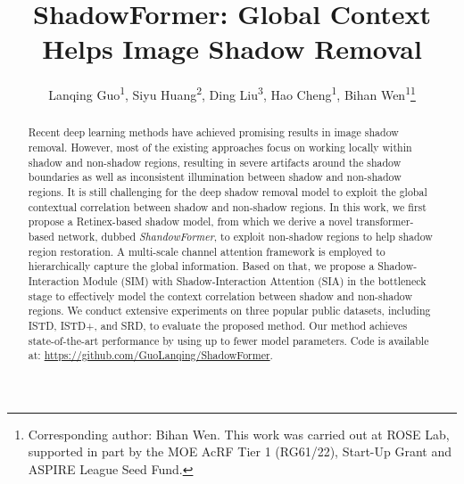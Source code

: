 \documentclass[letterpaper]{article} \usepackage{aaai23}  \usepackage{times}  \usepackage{helvet}  \usepackage{courier}  \usepackage[hyphens]{url}  \usepackage{graphicx} \urlstyle{rm} \def\UrlFont{\rm}  \usepackage{natbib}  \usepackage{caption} \frenchspacing  \setlength{\pdfpagewidth}{8.5in} \setlength{\pdfpageheight}{11in} \usepackage{algorithm}
\title{ShadowFormer: Global Context Helps Image Shadow Removal}
\author{Lanqing Guo\textsuperscript{\rm 1},
	Siyu Huang\textsuperscript{\rm 2},
	  Ding Liu\textsuperscript{\rm 3},
  Hao Cheng\textsuperscript{\rm 1},
  Bihan Wen\textsuperscript{\rm 1}\thanks{Corresponding author: Bihan Wen. This work was carried out at ROSE Lab, supported in part by the MOE AcRF Tier 1 (RG61/22), Start-Up Grant and ASPIRE League Seed Fund.}}
\begin{document}
\maketitle


\begin{abstract}
Recent deep learning methods have achieved promising results in image shadow removal.
However, most of the existing approaches focus on working locally within shadow and non-shadow regions, resulting in severe artifacts around the shadow boundaries as well as inconsistent illumination between shadow and non-shadow regions.
It is still challenging for the deep shadow removal model to exploit the global contextual correlation between shadow and non-shadow regions.
In this work, we first propose a Retinex-based shadow model, from which we derive a novel transformer-based network, dubbed \textit{ShandowFormer}, to exploit non-shadow regions to help shadow region restoration.
A multi-scale channel attention framework is employed to hierarchically capture the global information. Based on that,
we propose a Shadow-Interaction Module (SIM) with Shadow-Interaction Attention (SIA) in the bottleneck stage to effectively model the context correlation between shadow and non-shadow regions.
We conduct extensive experiments on three popular public datasets, including ISTD, ISTD+, and SRD, 
to evaluate the proposed method. Our method achieves state-of-the-art performance by using up to  fewer model parameters.
Code is available at: 
\href{https://github.com/GuoLanqing/ShadowFormer}{https://github.com/GuoLanqing/ShadowFormer}.
\end{abstract}
\end{document}
